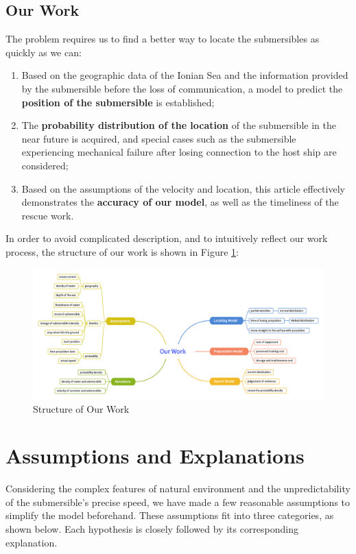 \documentclass[12pt]{article}
\begin{document}
\subsection{Our Work}
The problem requires us to find a better way to locate the submersibles as quickly as we can:
\begin{enumerate}[\bfseries 1.]
    \setlength{\parsep}{0ex}
    \setlength{\topsep}{0.5pt}
    \setlength{\itemsep}{0.5pt}
    \item Based on the geographic data of the Ionian Sea and the information provided by the submersible before the loss of communication, a model to predict the \textbf{position of the submersible} is established;
    \item The \textbf{probability distribution of the location} of the submersible in the near future is acquired, and special cases such as the submersible experiencing mechanical failure after losing connection to the host ship are considered;
\item Based on the assumptions of the velocity and location, this article effectively demonstrates the \textbf{accuracy of our model}, as well as the timeliness of the rescue work.
\end{enumerate}
In order to avoid complicated description, and to intuitively reflect our work process, the structure of our work is shown in Figure \ref{fig:structure}:

\begin{figure}[H]
\centering
\includegraphics[width=\textwidth]{newmindmap.png}
\caption{Structure of Our Work}
\label{fig:structure}
\end{figure}
\vspace{-0.8cm}

\section{Assumptions and Explanations}
Considering the complex features of natural environment and the unpredictability of the submersible's precise speed, we have made a few reasonable assumptions to simplify the model beforehand. These assumptions fit into three categories, as shown below. Each hypothesis is closely followed by its corresponding explanation.
\end{document}
